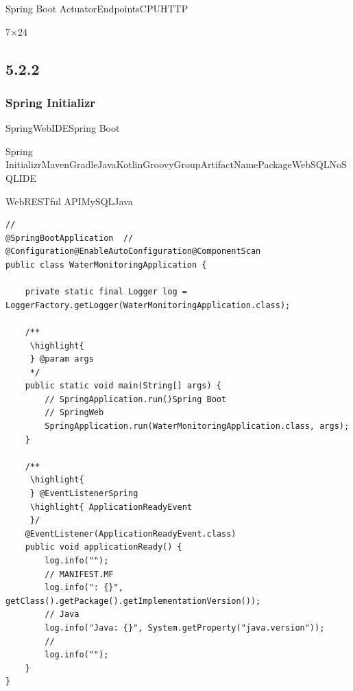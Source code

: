 Spring Boot
ActuatorEndpointsCPUHTTP

7×24

\hypertarget{section-23}{%
\subsection{5.2.2}\label{section-23}}

\hypertarget{spring-initializr}{%
\subsubsection{Spring Initializr}\label{spring-initializr}}

SpringWebIDESpring Boot

Spring
Initializr\important{}MavenGradle\important{}JavaKotlinGroovy\important{}GroupArtifactNamePackageWebSQLNoSQLIDE

WebRESTful
APIMySQLJava

\begin{lstlisting}[style=java]
// 
@SpringBootApplication  // @Configuration@EnableAutoConfiguration@ComponentScan
public class WaterMonitoringApplication {
    
    private static final Logger log = LoggerFactory.getLogger(WaterMonitoringApplication.class);
    
    /**
     \highlight{ 
     } @param args 
     */
    public static void main(String[] args) {
        // SpringApplication.run()Spring Boot
        // SpringWeb
        SpringApplication.run(WaterMonitoringApplication.class, args);
    }
    
    /**
     \highlight{ 
     } @EventListenerSpring
     \highlight{ ApplicationReadyEvent
     }/
    @EventListener(ApplicationReadyEvent.class)
    public void applicationReady() {
        log.info("");
        // MANIFEST.MF
        log.info(": {}", getClass().getPackage().getImplementationVersion());
        // Java
        log.info("Java: {}", System.getProperty("java.version"));
        // 
        log.info("");
    }
}
\end{lstlisting}

\important{}

